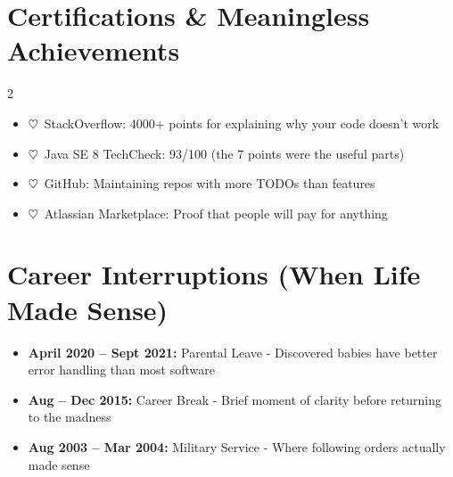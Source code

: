 \documentclass[11pt,a4paper]{article}
\newcommand{\heartstab}{{\color{heartcolor}$\heartsuit$}}
\begin{document}
\section{Certifications \& Meaningless Achievements}
\begin{multicols}{2}
\begin{itemize}[leftmargin=*,itemsep=0pt,topsep=0pt]
    \item \heartstab\ StackOverflow: 4000+ points for explaining why your code doesn't work
    \item \heartstab\ Java SE 8 TechCheck: 93/100 (the 7 points were the useful parts)
    \item \heartstab\ GitHub: Maintaining repos with more TODOs than features
    \item \heartstab\ Atlassian Marketplace: Proof that people will pay for anything
\end{itemize}
\end{multicols}
\section{Career Interruptions (When Life Made Sense)}
\begin{itemize}[leftmargin=*,itemsep=0pt]
    \item \textbf{April 2020 -- Sept 2021:} Parental Leave - Discovered babies have better error handling than most software
    \item \textbf{Aug -- Dec 2015:} Career Break - Brief moment of clarity before returning to the madness
    \item \textbf{Aug 2003 -- Mar 2004:} Military Service - Where following orders actually made sense
\end{itemize}
\end{document}

